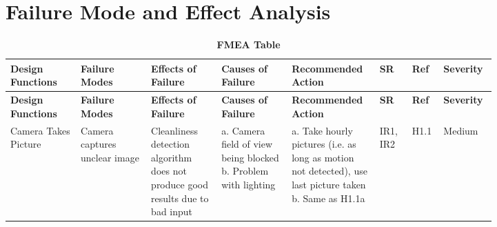 \documentclass{article}
\begin{document}
\section{Failure Mode and Effect Analysis}

\begin{longtable}{|>{\raggedright\arraybackslash}p{0.13\linewidth} | >{\raggedright\arraybackslash}p{0.13\linewidth} | >{\raggedright\arraybackslash}p{0.13\linewidth}| >{\raggedright\arraybackslash}p{0.13\linewidth}| >{\raggedright\arraybackslash}p{0.13\linewidth}| >{\raggedright\arraybackslash}p{0.06\linewidth}| >{\raggedright\arraybackslash}p{0.04\linewidth}| >{\raggedright\arraybackslash}p{0.07\linewidth}|}
    \caption{\bf FMEA Table} \label{tab:my_label} \\
    
    \hline
    \textbf{Design Functions} & \textbf{Failure Modes} & \textbf{Effects of Failure} & \textbf{Causes of Failure} & \textbf{Recommended Action} & \textbf{SR} & \textbf{Ref} & \textbf{Severity}\\
    \hline
    \endfirsthead
    
    \hline
    \textbf{Design Functions} & \textbf{Failure Modes} & \textbf{Effects of Failure} & \textbf{Causes of Failure} & \textbf{Recommended Action} & \textbf{SR} & \textbf{Ref} & \textbf{Severity}\\
    \hline
    \endhead
    
    \hline
    \endfoot
    
    \hline
    \endlastfoot


    \hline
    Camera Takes Picture & Camera captures unclear image \newline & Cleanliness detection algorithm does not produce good results due to bad input\newline & a. Camera field of view being blocked \newline b. Problem with lighting  \newline & a. Take hourly pictures (i.e. as long as motion not detected), use last picture taken \newline b. Same as H1.1a  \newline & IR1, \newline IR2 \newline & H1.1  \newline & Medium\\
    

\end{longtable}
\end{document}
